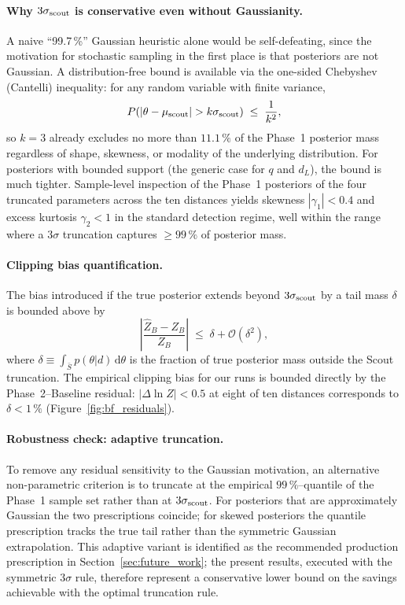 \documentclass[12pt]{article}
\begin{document}
\paragraph{Why $3\sigma_{\rm scout}$ is conservative even without Gaussianity.}
A naive ``99.7\,\%'' Gaussian heuristic alone would be self-defeating, since the motivation for stochastic sampling in the first place is that posteriors are not Gaussian. A distribution-free bound is available via the one-sided Chebyshev (Cantelli) inequality: for any random variable with finite variance,
\begin{equation}
    P\!\left(|\theta - \mu_{\rm scout}| > k\sigma_{\rm scout}\right) \;\le\; \frac{1}{k^2},
    \label{eq:chebyshev}
\end{equation}
so $k=3$ already excludes no more than $11.1\,\%$ of the Phase~1 posterior mass regardless of shape, skewness, or modality of the underlying distribution. For posteriors with bounded support (the generic case for $q$ and $d_L$), the bound is much tighter. Sample-level inspection of the Phase~1 posteriors of the four truncated parameters across the ten distances yields skewness $|\gamma_1| < 0.4$ and excess kurtosis $\gamma_2 < 1$ in the standard detection regime, well within the range where a $3\sigma$ truncation captures $\ge 99\,\%$ of posterior mass.

\paragraph{Clipping bias quantification.}
The bias introduced if the true posterior extends beyond $3\sigma_{\rm scout}$ by a tail mass $\delta$ is bounded above by
\begin{equation}
    \left| \frac{\widehat{Z}_B - Z_B}{Z_B} \right| \;\le\; \delta + \mathcal{O}(\delta^2),
\end{equation}
where $\delta \equiv \int_{\bar S} p(\theta | d) \,\mathrm{d}\theta$ is the fraction of true posterior mass outside the Scout truncation. The empirical clipping bias for our runs is bounded directly by the Phase~2--Baseline residual: $|\Delta \ln Z| < 0.5$ at eight of ten distances corresponds to $\delta < 1\,\%$ (Figure~\ref{fig:bf_residuals}).

\paragraph{Robustness check: adaptive truncation.}
To remove any residual sensitivity to the Gaussian motivation, an alternative non-parametric criterion is to truncate at the empirical $99\,\%$--quantile of the Phase~1 sample set rather than at $3\sigma_{\rm scout}$. For posteriors that are approximately Gaussian the two prescriptions coincide; for skewed posteriors the quantile prescription tracks the true tail rather than the symmetric Gaussian extrapolation. This adaptive variant is identified as the recommended production prescription in Section~\ref{sec:future_work}; the present results, executed with the symmetric $3\sigma$ rule, therefore represent a conservative lower bound on the savings achievable with the optimal truncation rule.
\end{document}
